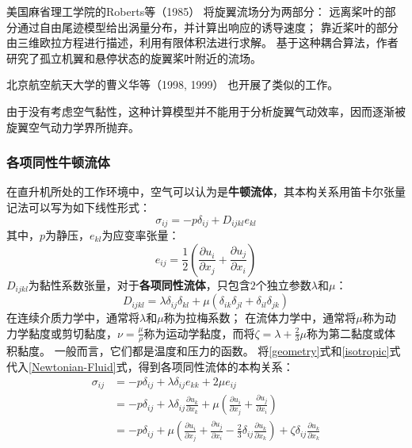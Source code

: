\documentclass[doctor,openright,twoside,color]{buaathesis}
\begin{document}
美国麻省理工学院的Roberts等（1985）
将旋翼流场分为两部分：
远离桨叶的部分通过自由尾迹模型给出涡量分布，并计算出响应的诱导速度；
靠近桨叶的部分由三维欧拉方程进行描述，利用有限体积法进行求解。
基于这种耦合算法，作者研究了孤立机翼和悬停状态的旋翼桨叶附近的流场。

北京航空航天大学的曹义华等（1998, 1999）
也开展了类似的工作。

由于没有考虑空气黏性，这种计算模型并不能用于分析旋翼气动效率，因而逐渐被旋翼空气动力学界所抛弃。

\subsubsection{各项同性牛顿流体}
在直升机所处的工作环境中，空气可以认为是\textbf{牛顿流体}，其本构关系用笛卡尔张量记法可以写为如下线性形式：
\begin{equation}\label{Newtonian-Fluid}
\sigma_{ij}
=
-p\delta_{ij}
+
{D}_{ijkl} e_{kl}
\end{equation}
其中，$p$为静压，$e_{kl}$为应变率张量：
\begin{equation}\label{geometry}
e_{ij}
=
\frac{1}{2}
\left(
\frac{\partial u_i}{\partial x_j}
+
\frac{\partial u_j}{\partial x_i}
\right)
\end{equation}
${D}_{ijkl}$为黏性系数张量，对于\textbf{各项同性流体}，只包含$2$个独立参数$\lambda$和$\mu$：
\begin{equation}\label{isotropic}
{D}_{ijkl}
=
\lambda \delta_{ij} \delta_{kl}
+
\mu \left( \delta_{ik} \delta_{jl} + \delta_{il} \delta_{jk} \right)
\end{equation}
在连续介质力学中，通常将$\lambda$和$\mu$称为拉梅系数；
在流体力学中，通常将$\mu$称为动力学黏度或剪切黏度，$\nu=\frac{\mu}{\rho}$称为运动学黏度，而将$\zeta=\lambda+\frac{2}{3}\mu$称为第二黏度或体积黏度。
一般而言，它们都是温度和压力的函数。
将\ref{geometry}式和\ref{isotropic}式代入\ref{Newtonian-Fluid}式，得到各项同性流体的本构关系：
\begin{equation}\label{Isotropic-Fluid}
\begin{split}
\sigma_{ij}
& = -p\delta_{ij} +\lambda \delta_{ij} e_{kk} +2\mu  e_{ij} \\
& = -p\delta_{ij} + \lambda \delta_{ij} \frac{\partial u_k}{\partial x_k}
                            + \mu \left( \frac{\partial u_i}{\partial x_j} + \frac{\partial u_j}{\partial x_i} \right) \\
& = -p\delta_{ij} + \mu \left( \frac{\partial u_i}{\partial x_j} + \frac{\partial u_j}{\partial x_i} - \frac{2}{3} \delta_{ij} \frac{\partial u_k}{\partial x_k} \right)
                            + \zeta \delta_{ij} \frac{\partial u_k}{\partial x_k}
\end{split}
\end{equation}
\end{document}
